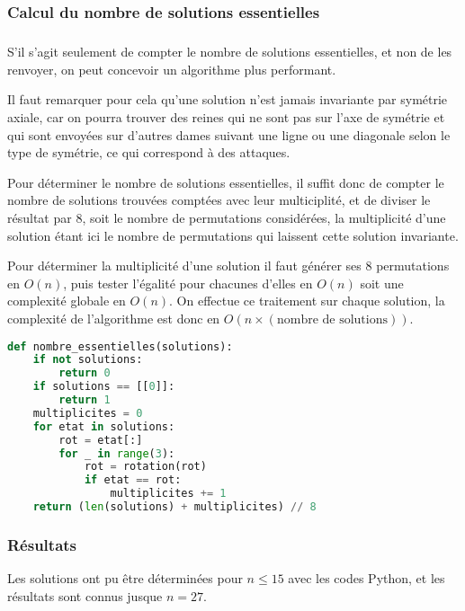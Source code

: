 \documentclass[a4paper]{article}
\begin{document}
\subsubsection{Calcul du nombre de solutions essentielles}
\subparagraph{}
S'il s'agit seulement de compter le nombre de solutions essentielles, et non de les renvoyer, on peut concevoir un algorithme plus performant.

Il faut remarquer pour cela qu'une solution n'est jamais invariante par symétrie axiale, car on pourra trouver des reines qui ne sont pas sur l'axe de symétrie et qui sont envoyées sur d'autres dames suivant une ligne ou une diagonale selon le type de symétrie, ce qui correspond à des attaques.

Pour déterminer le nombre de solutions essentielles, il suffit donc de compter le nombre de solutions trouvées comptées avec leur multiciplité, et de diviser le résultat par $8$, soit le nombre de permutations considérées, la multiplicité d'une solution étant ici le nombre de permutations qui laissent cette solution invariante.

Pour déterminer la multiplicité d'une solution il faut générer ses $8$ permutations en $O(n)$, puis tester l'égalité pour chacunes d'elles en $O(n)$ soit une complexité globale en $O(n)$. On effectue ce traitement sur chaque solution, la complexité de l'algorithme est donc en $O(n\times(\text{nombre de solutions}))$.

\begin{lstlisting}[language=Python,keywordstyle=\color{blue},stringstyle=\color{purple},commentstyle=\color{red},breaklines=true,extendedchars=true]
def nombre_essentielles(solutions):
	if not solutions:
		return 0
	if solutions == [[0]]:
		return 1
	multiplicites = 0
	for etat in solutions:
		rot = etat[:]
		for _ in range(3):
			rot = rotation(rot)
			if etat == rot:
				multiplicites += 1
	return (len(solutions) + multiplicites) // 8
\end{lstlisting}


\subsubsection{Résultats}
Les solutions ont pu être déterminées pour $n \leq 15$ avec les codes Python, et les résultats sont connus jusque $n=27$.
\end{document}
